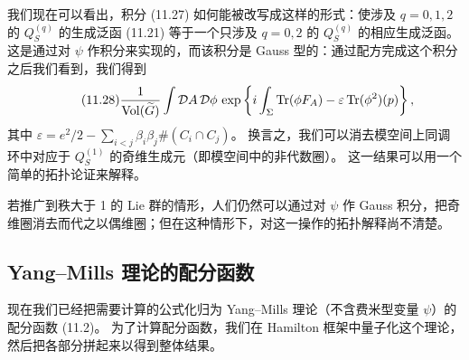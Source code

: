 我们现在可以看出，积分 (11.27) 如何能被改写成这样的形式：使涉及 $q=0,1,2$ 的 $Q_{S}^{(q)}$ 的生成泛函 (11.21) 等于一个只涉及 $q=0,2$ 的 $Q_{S}^{(q)}$ 的相应生成泛函。
这是通过对 $\psi$ 作积分来实现的，而该积分是 Gauss 型的：通过配方完成这个积分之后我们看到，我们得到
\begin{equation}
  \tag{11.28}
  \label{eq:11-28}
  \frac{1}{\mathrm{Vol}(\widetilde G)}\int\mathcal{D}A\,\mathcal{D}\phi\,
  \exp\left\{i\int_{\Sigma}\operatorname{Tr}(\phi F_{A})-\varepsilon\operatorname{Tr}(\phi^{2})(p)\right\},
\end{equation}
其中 $\varepsilon=e^{2}/2-\sum_{i<j}\beta_{i}\beta_{j}\#(C_{i}\cap C_{j})$。
换言之，我们可以消去模空间上同调环中对应于 $Q_{S}^{(1)}$ 的奇维生成元（即模空间中的非代数圈）。
这一结果可以用一个简单的拓扑论证来解释。

若推广到秩大于 1 的 Lie 群的情形，人们仍然可以通过对 $\psi$ 作 Gauss 积分，把奇维圈消去而代之以偶维圈；但在这种情形下，对这一操作的拓扑解释尚不清楚。


\subsection{Yang–Mills 理论的配分函数}

现在我们已经把需要计算的公式化归为 Yang–Mills 理论（不含费米型变量 $\psi$）的配分函数 (11.2)。
为了计算配分函数，我们在 Hamilton 框架中量子化这个理论，然后把各部分拼起来以得到整体结果。

